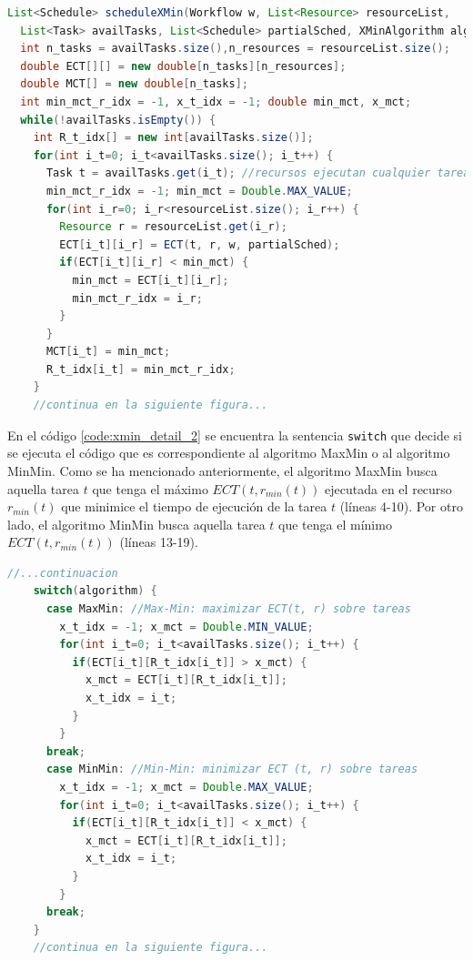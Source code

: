\begin{lstlisting}[language=java,label={code:xmin_detail_1},caption={Método de MaxMin/MinMin que planifica las tareas (parte 1)},float]
List<Schedule> scheduleXMin(Workflow w, List<Resource> resourceList, 
  List<Task> availTasks, List<Schedule> partialSched, XMinAlgorithm algorithm) {
  int n_tasks = availTasks.size(),n_resources = resourceList.size();
  double ECT[][] = new double[n_tasks][n_resources];
  double MCT[] = new double[n_tasks];
  int min_mct_r_idx = -1, x_t_idx = -1; double min_mct, x_mct;
  while(!availTasks.isEmpty()) {
    int R_t_idx[] = new int[availTasks.size()];
    for(int i_t=0; i_t<availTasks.size(); i_t++) {
      Task t = availTasks.get(i_t); //recursos ejecutan cualquier tarea
      min_mct_r_idx = -1; min_mct = Double.MAX_VALUE;
      for(int i_r=0; i_r<resourceList.size(); i_r++) {
        Resource r = resourceList.get(i_r);
        ECT[i_t][i_r] = ECT(t, r, w, partialSched);
        if(ECT[i_t][i_r] < min_mct) {
          min_mct = ECT[i_t][i_r];
          min_mct_r_idx = i_r;
        }
      }
      MCT[i_t] = min_mct;
      R_t_idx[i_t] = min_mct_r_idx;
    }
    //continua en la siguiente figura...
\end{lstlisting}

En el código \ref{code:xmin_detail_2} se encuentra la sentencia \texttt{switch} que decide si se ejecuta el código que es correspondiente al algoritmo MaxMin o al algoritmo MinMin. Como se ha mencionado anteriormente, el algoritmo MaxMin busca aquella tarea $t$ que tenga el máximo $ECT(t,r_{min}(t))$ ejecutada en el recurso $r_{min}(t)$ que minimice el tiempo de ejecución de la tarea $t$ (líneas 4-10). Por otro lado, el algoritmo MinMin busca aquella tarea $t$ que tenga el mínimo $ECT(t,r_{min}(t))$ (líneas 13-19).

\begin{lstlisting}[language=java,label={code:xmin_detail_2},caption={Método de MaxMin/MinMin que planifica las tareas (parte 2)},float]
    //...continuacion
    switch(algorithm) {
      case MaxMin: //Max-Min: maximizar ECT(t, r) sobre tareas
        x_t_idx = -1; x_mct = Double.MIN_VALUE;
        for(int i_t=0; i_t<availTasks.size(); i_t++) {
          if(ECT[i_t][R_t_idx[i_t]] > x_mct) {
            x_mct = ECT[i_t][R_t_idx[i_t]];
            x_t_idx = i_t;
          }
        }
      break;
      case MinMin: //Min-Min: minimizar ECT (t, r) sobre tareas
        x_t_idx = -1; x_mct = Double.MAX_VALUE;
        for(int i_t=0; i_t<availTasks.size(); i_t++) {
          if(ECT[i_t][R_t_idx[i_t]] < x_mct) {
            x_mct = ECT[i_t][R_t_idx[i_t]];
            x_t_idx = i_t;
          }
        }
      break;
    }
    //continua en la siguiente figura...
\end{lstlisting}


